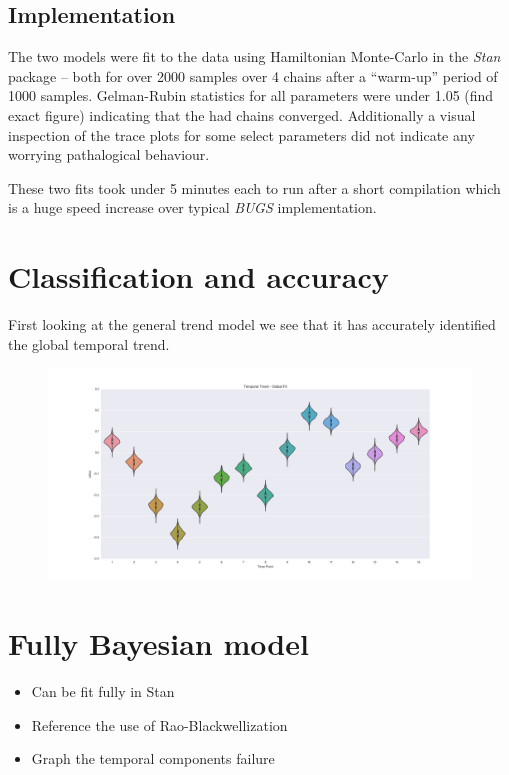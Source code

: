 \documentclass[11pt]{report}
\begin{document}
\subsection{Implementation}

The two models were fit to the data using Hamiltonian Monte-Carlo in the \emph{Stan} package -- both for over 2000 samples over 4 chains after a ``warm-up'' period of 1000 samples. Gelman-Rubin statistics for all parameters were under 1.05 (find exact figure) indicating that the had chains converged. Additionally a visual inspection of the trace plots for some select parameters did not indicate any worrying pathalogical behaviour.

These two fits took under 5 minutes each to run after a short compilation which is a huge speed increase over typical \emph{BUGS} implementation.

\section{Classification and accuracy}

First looking at the general trend model we see that it has accurately identified the global temporal trend. 

\begin{figure}
\centering
\includegraphics[width=\textwidth]{global_temporal}
\end{figure}

\section{Fully Bayesian model}

\begin{itemize}
\item Can be fit fully in Stan
\item Reference the use of Rao-Blackwellization
\item Graph the temporal components failure
\end{itemize}
\end{document}

